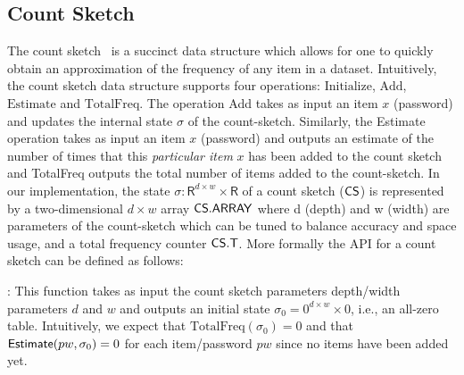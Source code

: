 \vspace*{-\baselineskip}
\vspace*{-\baselineskip}
\subsection{Count Sketch}\label{section:Prelinmaries-CountSketch} %
\vspace*{-\baselineskip}

The count sketch~\cite{ICALP:ChaCheFar02} is a succinct data structure which allows for one to quickly obtain an approximation of the frequency of any item in a dataset. {Intuitively, the count sketch data structure supports four operations: $\text{Initialize}$, $\text{Add}$, $\text{Estimate}$ and $\text{TotalFreq}$. The operation Add takes as input an item $x$ (password) and updates the internal state $\sigma$ of the count-sketch. Similarly, the Estimate operation takes as input an item $x$ (password) and outputs an estimate of the number of times that this {\em particular item} $x$ has been added to the count sketch and TotalFreq outputs the total number of items added to the count-sketch. In our implementation, the } 
state $\sigma: \mathsf{R}^{d\times w} \times \mathsf{R}$ of a count sketch ($\mathsf{CS}$) is represented by a two-dimensional $d\times w$ array $\mathsf{CS.ARRAY}$ {where d (depth) and w (width) are parameters of the count-sketch which can be tuned to balance accuracy and space usage,} and a total frequency counter $\mathsf{CS.T}$.  {More formally the API for a count sketch can be defined as follows: }

	

: {This function takes as input the count sketch parameters depth/width parameters $d$ and $w$ and outputs an initial state $\sigma_0 = 0^{d\times w}\times 0$, i.e., an all-zero table. Intuitively, we expect that  $\text{TotalFreq}(\sigma_0)=0$ and that $\textsf{Estimate}(pw,\sigma_0)=0$ for each item/password $pw$ since no items have been added yet.  }


